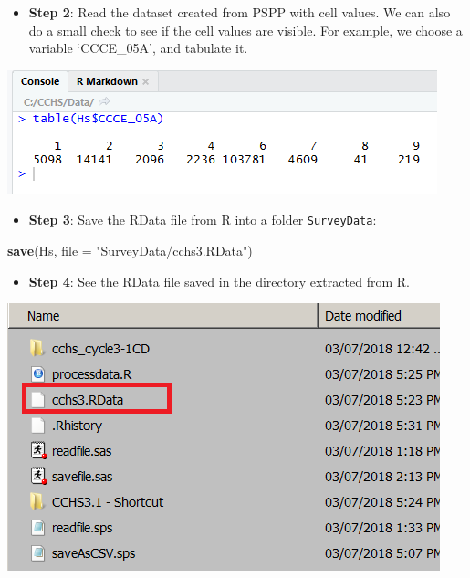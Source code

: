 \documentclass[
]{book}
\newenvironment{Shaded}{\begin{snugshade}}{\end{snugshade}}
\newcommand{\DataTypeTok}[1]{\textcolor[rgb]{0.13,0.29,0.53}{#1}}
\newcommand{\KeywordTok}[1]{\textcolor[rgb]{0.13,0.29,0.53}{\textbf{#1}}}
\newcommand{\NormalTok}[1]{#1}
\newcommand{\OperatorTok}[1]{\textcolor[rgb]{0.81,0.36,0.00}{\textbf{#1}}}
\newcommand{\OtherTok}[1]{\textcolor[rgb]{0.56,0.35,0.01}{#1}}
\newcommand{\StringTok}[1]{\textcolor[rgb]{0.31,0.60,0.02}{#1}}
\providecommand{\tightlist}{%
  \setlength{\itemsep}{0pt}\setlength{\parskip}{0pt}}
\begin{document}
\begin{itemize}
\tightlist
\item
  \textbf{Step 2}: Read the dataset created from PSPP with cell values. We can also do a small check to see if the cell values are visible. For example, we choose a variable `CCCE\_05A', and tabulate it.
\end{itemize}

\begin{Shaded}
\end{Shaded}

\includegraphics[width=0.65\linewidth]{images/abacus46}

\begin{itemize}
\tightlist
\item
  \textbf{Step 3}: Save the RData file from R into a folder \texttt{SurveyData}:
\end{itemize}

\begin{Shaded}
\begin{Highlighting}[]
\KeywordTok{save}\NormalTok{(Hs, }\DataTypeTok{file =} \StringTok{"SurveyData/cchs3.RData"}\NormalTok{)}
\end{Highlighting}
\end{Shaded}

\begin{itemize}
\tightlist
\item
  \textbf{Step 4}: See the RData file saved in the directory extracted from R.
\end{itemize}

\includegraphics[width=0.65\linewidth]{images/abacus43}
\end{document}
